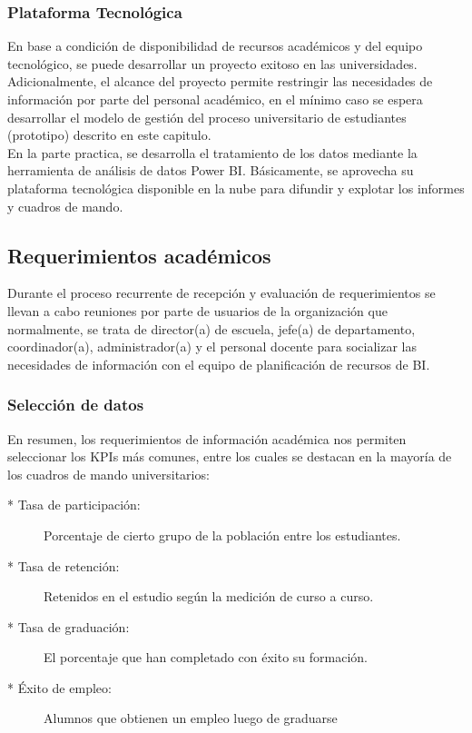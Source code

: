 \documentclass[11pt,titlepage]{report}
\begin{document}
\subsubsection{Plataforma Tecnológica}
En base a condición de disponibilidad de recursos académicos y del equipo tecnológico, se puede desarrollar un proyecto exitoso en las universidades. Adicionalmente, el alcance del proyecto permite restringir las necesidades de información por parte del personal académico, en el mínimo caso se espera desarrollar el modelo de gestión del proceso universitario de estudiantes (prototipo) descrito en este capitulo.\\

En la parte practica, se desarrolla el tratamiento de los datos mediante la herramienta de análisis de datos Power BI. Básicamente, se aprovecha su plataforma tecnológica disponible en la nube para difundir y explotar los informes y cuadros de mando.

\subsection{Requerimientos académicos}

Durante el proceso recurrente de recepción y evaluación de requerimientos se llevan a cabo reuniones por parte de usuarios de la organización que normalmente, se trata de director(a) de escuela, jefe(a) de departamento, coordinador(a), administrador(a) y el personal docente para socializar las necesidades de información con el equipo de planificación de recursos de BI.

\subsubsection{Selección de datos}
En resumen, los requerimientos de información académica nos permiten seleccionar los KPIs más comunes, entre los cuales se destacan en la mayoría de los cuadros de mando universitarios:
\begin{description}
\item[* Tasa de participación:]
Porcentaje de cierto grupo de la población entre los estudiantes.
\item[* Tasa de retención:]  
Retenidos en el estudio según la medición de curso a curso.
\item[* Tasa de graduación:]
El porcentaje que han completado con éxito su formación.
\item[* Éxito de empleo:]
Alumnos que obtienen un empleo luego de graduarse
\end{description}
\end{document}
